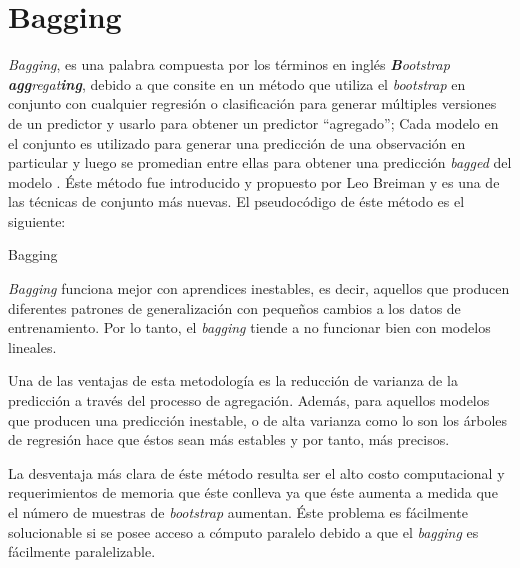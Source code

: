 \section{Bagging}
\textit{Bagging}, es una palabra compuesta por los términos en inglés \textit{\textbf{B}ootstrap \textbf{agg}regat\textbf{ing}}, 
debido a que consite en un método que utiliza el \textit{bootstrap} en conjunto con cualquier regresión o clasificación
para generar múltiples versiones de un predictor y usarlo para obtener un predictor ``agregado''\cite{22}; Cada modelo en el conjunto es utilizado para generar una predicción de una observación en particular 
y luego se promedian entre ellas para obtener una predicción \textit{bagged} del modelo .
Éste método fue introducido y propuesto por Leo Breiman y es una de las técnicas
de conjunto más nuevas. El pseudocódigo de éste método es el siguiente:

\begin{algorithm}
    \caption{Bagging}

    \begin{algorithmic}[1]
        \ENDFOR

    \end{algorithmic}
\end{algorithm}

\textit{Bagging} funciona mejor con aprendices inestables, es decir, aquellos que producen diferentes
patrones de generalización con pequeños cambios a los datos de entrenamiento. Por lo tanto, el \textit{bagging} tiende a no funcionar bien con modelos lineales\cite{19}.

Una de las ventajas de esta metodología es la reducción de varianza de la predicción a través del processo de agregación. Además, para aquellos modelos que producen una predicción inestable,
o de alta varianza como lo son los árboles de regresión hace que éstos sean más estables\cite{18} y por tanto, más precisos.

La desventaja más clara de éste método resulta ser el alto costo computacional y requerimientos de memoria que éste conlleva ya que éste aumenta a medida que el número de muestras
de \textit{bootstrap} aumentan. Éste problema es fácilmente solucionable si se posee acceso a cómputo paralelo debido a que el \textit{bagging} es fácilmente paralelizable\cite{18}.
%
%
%
%
